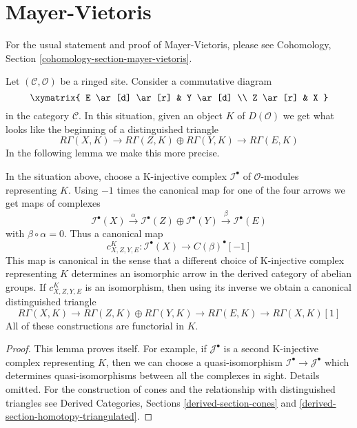\section{Mayer-Vietoris}
\label{section-mayer-vietoris}

\noindent
For the usual statement and proof of Mayer-Vietoris, please
see Cohomology, Section \ref{cohomology-section-mayer-vietoris}.

\medskip\noindent
Let $(\mathcal{C}, \mathcal{O})$ be a ringed site. Consider a
commutative diagram
$$
\xymatrix{
E \ar[d] \ar[r] & Y \ar[d] \\
Z \ar[r] & X
}
$$
in the category $\mathcal{C}$. In this situation, given an object
$K$ of $D(\mathcal{O})$ we get what looks like the
beginning of a distinguished triangle
$$
R\Gamma(X, K) \to
R\Gamma(Z, K) \oplus
R\Gamma(Y, K) \to
R\Gamma(E, K)
$$
In the following lemma we make this more precise.

\begin{lemma}
\label{lemma-c-square}
In the situation above, choose a K-injective complex $\mathcal{I}^\bullet$
of $\mathcal{O}$-modules representing $K$. Using $-1$ times the canonical map
for one of the four arrows we get maps of complexes
$$
\mathcal{I}^\bullet(X) \xrightarrow{\alpha}
\mathcal{I}^\bullet(Z) \oplus
\mathcal{I}^\bullet(Y) \xrightarrow{\beta}
\mathcal{I}^\bullet(E)
$$
with $\beta \circ \alpha = 0$. Thus a canonical map
$$
c^K_{X, Z, Y, E} :
\mathcal{I}^\bullet(X)
\longrightarrow
C(\beta)^\bullet[-1]
$$
This map is canonical in the sense that a different choice
of K-injective complex representing $K$ determines an isomorphic
arrow in the derived category of abelian groups. If $c^K_{X, Z, Y, E}$
is an isomorphism, then using its inverse we obtain a canonical
distinguished triangle
$$
R\Gamma(X, K) \to
R\Gamma(Z, K) \oplus
R\Gamma(Y, K) \to
R\Gamma(E, K) \to
R\Gamma(X, K)[1]
$$
All of these constructions are functorial in $K$.
\end{lemma}

\begin{proof}
This lemma proves itself. For example, if $\mathcal{J}^\bullet$
is a second K-injective complex representing $K$, then
we can choose a quasi-isomorphism
$\mathcal{I}^\bullet \to \mathcal{J}^\bullet$
which determines quasi-isomorphisms between all the complexes
in sight. Details omitted. For the construction of cones
and the relationship with distinguished triangles see
Derived Categories, Sections \ref{derived-section-cones} and
\ref{derived-section-homotopy-triangulated}.
\end{proof}

